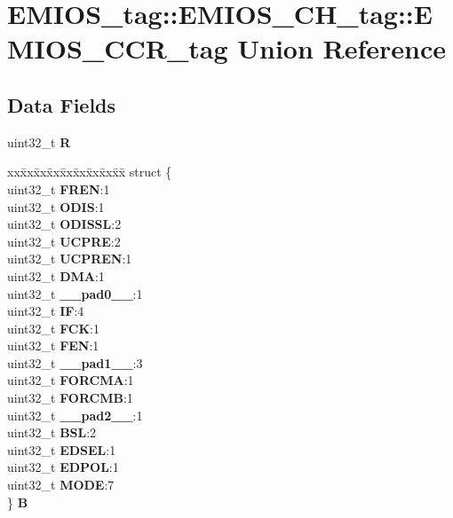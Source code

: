 \hypertarget{unionEMIOS__tag_1_1EMIOS__CH__tag_1_1EMIOS__CCR__tag}{}\section{E\+M\+I\+O\+S\+\_\+tag\+::E\+M\+I\+O\+S\+\_\+\+C\+H\+\_\+tag\+::E\+M\+I\+O\+S\+\_\+\+C\+C\+R\+\_\+tag Union Reference}
\label{unionEMIOS__tag_1_1EMIOS__CH__tag_1_1EMIOS__CCR__tag}
\subsection*{Data Fields}
\begin{DoxyCompactItemize}
\item 
\mbox{\label{unionEMIOS__tag_1_1EMIOS__CH__tag_1_1EMIOS__CCR__tag_ab05ae0c2a1f5b4d358bfeef856ff1981}} 
uint32\+\_\+t {\bfseries R}
\item 
\mbox{\label{unionEMIOS__tag_1_1EMIOS__CH__tag_1_1EMIOS__CCR__tag_af448f5c016bf10507d4c0dea0120bc98}} 
\begin{tabbing}
xx\=xx\=xx\=xx\=xx\=xx\=xx\=xx\=xx\=\kill
struct \{\\
\>uint32\_t {\bfseries FREN}:1\\
\>uint32\_t {\bfseries ODIS}:1\\
\>uint32\_t {\bfseries ODISSL}:2\\
\>uint32\_t {\bfseries UCPRE}:2\\
\>uint32\_t {\bfseries UCPREN}:1\\
\>uint32\_t {\bfseries DMA}:1\\
\>uint32\_t {\bfseries \_\_pad0\_\_}:1\\
\>uint32\_t {\bfseries IF}:4\\
\>uint32\_t {\bfseries FCK}:1\\
\>uint32\_t {\bfseries FEN}:1\\
\>uint32\_t {\bfseries \_\_pad1\_\_}:3\\
\>uint32\_t {\bfseries FORCMA}:1\\
\>uint32\_t {\bfseries FORCMB}:1\\
\>uint32\_t {\bfseries \_\_pad2\_\_}:1\\
\>uint32\_t {\bfseries BSL}:2\\
\>uint32\_t {\bfseries EDSEL}:1\\
\>uint32\_t {\bfseries EDPOL}:1\\
\>uint32\_t {\bfseries MODE}:7\\
\} {\bfseries B}\\


\end{tabbing}
\end{DoxyCompactItemize}
